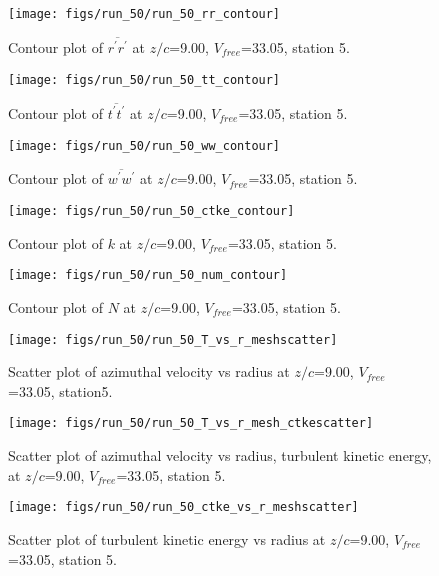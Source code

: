 \begin{figure}[H]
\centering
\texttt{[image: figs/run\_50/run\_50\_rr\_contour]}
\caption{Contour plot of $\overline{r^\prime r^\prime}$ at $z/c$=9.00, $V_{free}$=33.05, station 5.}
\label{fig:run_50_rr_contour}
\end{figure}


\begin{figure}[H]
\centering
\texttt{[image: figs/run\_50/run\_50\_tt\_contour]}
\caption{Contour plot of $\overline{t^\prime t^\prime}$ at $z/c$=9.00, $V_{free}$=33.05, station 5.}
\label{fig:run_50_tt_contour}
\end{figure}


\begin{figure}[H]
\centering
\texttt{[image: figs/run\_50/run\_50\_ww\_contour]}
\caption{Contour plot of $\overline{w^\prime w^\prime}$ at $z/c$=9.00, $V_{free}$=33.05, station 5.}
\label{fig:run_50_ww_contour}
\end{figure}


\begin{figure}[H]
\centering
\texttt{[image: figs/run\_50/run\_50\_ctke\_contour]}
\caption{Contour plot of $k$ at $z/c$=9.00, $V_{free}$=33.05, station 5.}
\label{fig:run_50_ctke_contour}
\end{figure}


\begin{figure}[H]
\centering
\texttt{[image: figs/run\_50/run\_50\_num\_contour]}
\caption{Contour plot of $N$ at $z/c$=9.00, $V_{free}$=33.05, station 5.}
\label{fig:run_50_num_contour}
\end{figure}


\begin{figure}[H]
\centering
\texttt{[image: figs/run\_50/run\_50\_T\_vs\_r\_meshscatter]}
\caption{Scatter plot of azimuthal velocity vs radius at $z/c$=9.00, $V_{free}$=33.05, station5.}
\label{fig:run_50_T_vs_r_meshscatter}
\end{figure}


\begin{figure}[H]
\centering
\texttt{[image: figs/run\_50/run\_50\_T\_vs\_r\_mesh\_ctkescatter]}
\caption{Scatter plot of azimuthal velocity vs radius, turbulent kinetic energy, at $z/c$=9.00, $V_{free}$=33.05, station 5.}
\label{fig:run_50_T_vs_r_mesh_ctkescatter}
\end{figure}


\begin{figure}[H]
\centering
\texttt{[image: figs/run\_50/run\_50\_ctke\_vs\_r\_meshscatter]}
\caption{Scatter plot of turbulent kinetic energy vs radius at $z/c$=9.00, $V_{free}$=33.05, station 5.}
\label{fig:run_50_ctke_vs_r_meshscatter}
\end{figure}


